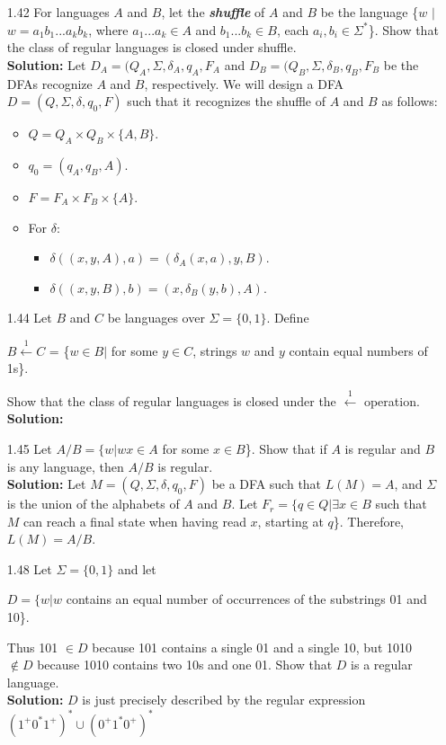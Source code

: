 \begin{enumerate}
\item[1.42]For languages $A$ and $B$, let the \emph{\textbf{shuffle}} of $A$ and $B$ be the language \{$w$ $|$ $w=a_1b_1...a_kb_k$, where $a_1...a_k \in A$ and $b_1...b_k \in B$, each $a_i,b_i \in \Sigma^*$\}. Show that the class of regular languages is closed under shuffle.
\\
\textbf{Solution:} Let $D_A = (Q_A, \Sigma, \delta_A, q_A, F_A$ and $D_B = (Q_B, \Sigma, \delta_B, q_B, F_B$ be the DFAs recognize $A$ and $B$, respectively. We will design a DFA $D = (Q, \Sigma, \delta, q_0, F)$ such that it recognizes the shuffle of $A$ and $B$ as follows:
\begin{itemize}
\item $Q = Q_A \times Q_B \times \{A, B\}$.
\item $q_0 = (q_A, q_B, A)$.
\item $F = F_A \times F_B \times \{A\}$.
\item For $\delta$:
\begin{itemize}
\item $\delta((x, y, A), a) = (\delta_A(x, a), y, B)$.
\item $\delta((x, y, B), b) = (x, \delta_B(y, b), A)$.
\end{itemize}
\end{itemize}

\item[1.44]Let $B$ and $C$ be languages over $\Sigma = \{0, 1\}$. Define
\begin{center}
$B \xleftarrow{1} C$ = \{$w \in B |$ for some $y \in C$, strings $w$ and $y$ contain equal numbers of 1s\}. 
\end{center}
Show that the class of regular languages is closed under the $\xleftarrow{1}$ operation.
\\
\textbf{Solution:} \alreadyanswered

\item[1.45]Let $A/B = \{w | wx \in A$ for some $x \in B$\}. Show that if $A$ is regular and $B$ is any language, then $A/B$ is regular.
\\
\textbf{Solution:} Let $M = (Q, \Sigma, \delta, q_0, F)$ be a DFA such that $L(M) = A$, and $\Sigma$ is the union of the alphabets of $A$ and $B$. Let $F_{r} = \{q \in Q | \exists x \in B$ such that $M$ can reach a final state when having read $x$, starting at $q$\}. Therefore, $L(M) = A/B$. 

\item[1.48]Let $\Sigma = \{0, 1\}$ and let
\begin{center}
$D = \{w | w$ contains an equal number of occurrences of the substrings 01 and 10\}.
\end{center}
Thus 101 $\in D$ because 101 contains a single 01 and a single 10, but 1010 $\notin D$ because 1010 contains two 10s and one 01. Show that $D$ is a regular language. 
\\
\textbf{Solution:} $D$ is just precisely described by the regular expression $(1^+0^*1^+)^* \cup (0^+1^*0^+)^*$


\end{enumerate}

